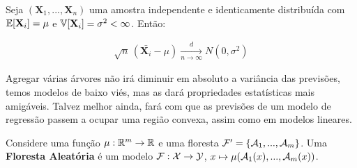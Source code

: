 \begin{teo}
Seja $(\textbf{X}_1, ..., \textbf{X}_n)$ uma amostra independente e identicamente distribuída com $\mathbb{E}[\textbf{X}_i] = \mu$ e $\mathbb{V}[\textbf{X}_i] = \sigma^2 < \infty$. Então:

\begin{align}
    \sqrt{n}\,(\bar{\textbf{X}_i }- \mu) \xrightarrow[n \to \infty]{d} N(0, \sigma^2)
\end{align}

\end{teo}


Agregar várias árvores não irá diminuir em absoluto a variância das previsões, temos modelos de baixo viés, mas as dará propriedades estatísticas mais amigáveis. Talvez melhor ainda, fará com que as previsões de um modelo de regressão passem a ocupar uma região convexa, assim como em modelos lineares.

\begin{defi}
Considere uma função $\mu : \mathbb{R}^m \to \mathbb{R}$ e uma floresta $\mathcal{F}' = \{\mathcal{A}_1, ..., \mathcal{A}_m\}$. Uma \textbf{Floresta Aleatória} é um modelo $\mathcal{F} : \mathcal{X} \to \mathcal{Y}$,  $x \mapsto \mu(\mathcal{A}_1(x), ..., \mathcal{A}_m(x))$. 
\end{defi}
















  
  
